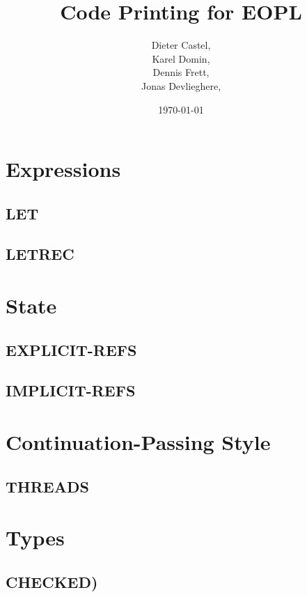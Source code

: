 \documentclass[11pt,a4paper]{book}
\title{Code Printing for EOPL}
\date{\today}
\author{Dieter Castel, \\ Karel Domin, \\ Dennis Frett, \\ Jonas Devlieghere,}
\begin{document}
\frontmatter
\maketitle
\tableofcontents

\mainmatter
\setcounter{chapter}{2}
\chapter{Expressions}

\section{LET}


\section{LETREC}


\chapter{State}

\section{EXPLICIT-REFS}


\section{IMPLICIT-REFS}


\chapter{Continuation-Passing Style}

\section{THREADS}


\setcounter{chapter}{6}
\chapter{Types}

\section{CHECKED)}

\end{document}
